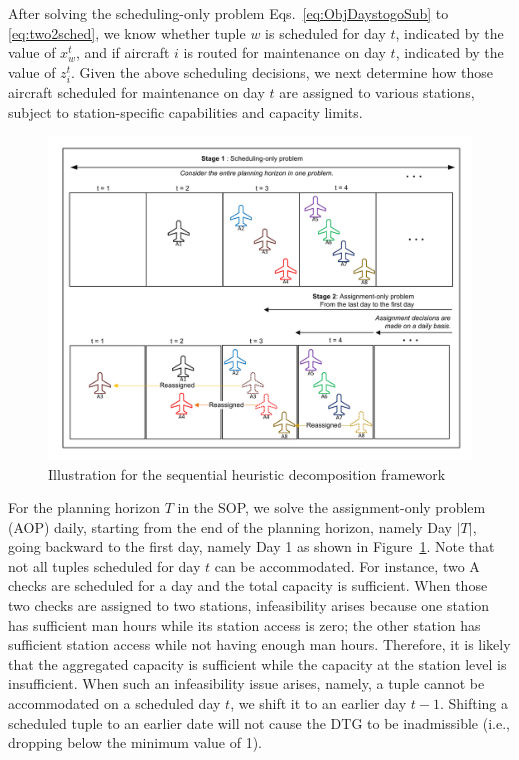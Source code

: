 After solving the scheduling-only problem Eqs.~\eqref{eq:ObjDaystogoSub} to \eqref{eq:two2sched}, we know whether tuple $w$ is scheduled for day $t$, indicated by the value of $x_{w}^t$, and if aircraft $i$ is routed for maintenance on day $t$, indicated by the value of $z_{i}^t$. Given the above scheduling decisions, we next determine how those aircraft scheduled for maintenance on day $t$ are assigned to various stations, subject to station-specific capabilities and capacity limits. 

\begin{figure}[htbp]
    \centering
    \includegraphics[width=\linewidth]{sequential_heurisicsv3.pdf}
    \caption{Illustration for the sequential heuristic decomposition framework}
    \label{fig:sh-framework}
\end{figure}


For the planning horizon $T$ in the SOP, we solve the assignment-only problem (AOP) daily, starting from the end of the planning horizon, namely Day $|T|$, going backward to the first day, namely Day 1 as shown in Figure~\ref{fig:sh-framework}. Note that not all tuples scheduled for day $t$ can be accommodated. For instance, two A checks are scheduled for a day and the total capacity is sufficient. When those two checks are assigned to two stations, infeasibility arises because one station has sufficient man hours while its station access is zero; the other station has sufficient station access while not having enough man hours. Therefore, it is likely that the aggregated capacity is sufficient while the capacity at the station level is insufficient. When such an infeasibility issue arises, namely, a tuple cannot be accommodated on a scheduled day $t$, we shift it to an earlier day $t-1$. Shifting a scheduled tuple to an earlier date will not cause the DTG to be inadmissible (i.e., dropping below the minimum value of 1).


